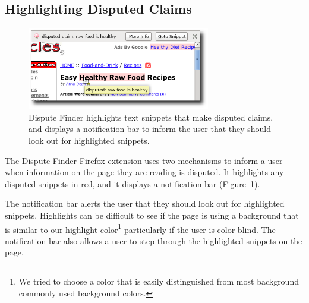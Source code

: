\documentclass{www2010-accepted}
\newcommand{\todo}[1]{}
\begin{document}
\todo{Give an example of a good meme}

\todo{Talk about what dispute finder does, and how it differs - maybe by moving this into the main system section}
\todo{Cite plagarism detection}
\todo{Talk about how our algorithm looks for key terms used in disputed claims}
\todo{Talk about how our first pass NLP algo is rather like }


\subsection{Highlighting Disputed Claims}

\begin{figure}[tb]
	\begin{center}
	\includegraphics[width=8cm]{pictures/highlight_bar.png}
	\caption{Dispute Finder highlights text snippets that make disputed claims, and displays a notification bar to inform the user that they should look out for highlighted snippets.}
	\label{highlight_bar}
	\end{center}
\end{figure}

%
%

The Dispute Finder Firefox extension uses two mechanisms to inform a user when information on the page they are reading is disputed. It highlights any disputed snippets in red, and it displays a notification bar (Figure~\ref{highlight_bar}). 

The notification bar alerts the user that they should look out for highlighted snippets. Highlights can be difficult to see if the page is using a background that is similar to our highlight color\footnote{We tried to choose a color that is easily distinguished from most background commonly used background colors.} particularly if the user is color blind. The notification bar also allows a user to step through the highlighted snippets on the page.
\end{document}
